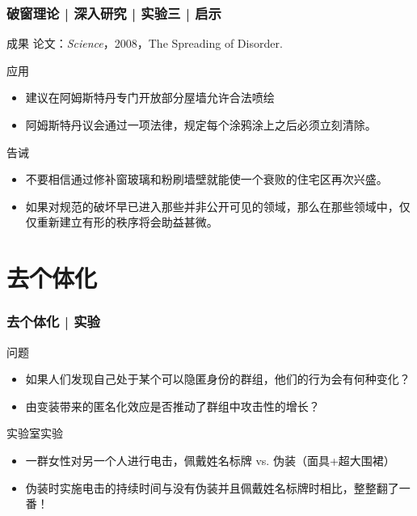 \begin{frame}
  \frametitle{破窗理论 | 深入研究 | 实验三 | 启示}
  \begin{block}{成果}
    论文：\textit{Science}，2008，The Spreading of Disorder.
  \end{block}
  \pause
  \begin{block}{应用}
    \begin{itemize}
      \item 建议在阿姆斯特丹专门开放部分屋墙允许合法喷绘
      \item 阿姆斯特丹议会通过一项法律，规定每个涂鸦涂上之后必须立刻清除。
    \end{itemize}
  \end{block}
  \pause
  \begin{block}{告诫}
    \begin{itemize}
       \item  不要相信通过修补窗玻璃和粉刷墙壁就能使一个衰败的住宅区再次兴盛。
       \item 如果对规范的破坏早已进入那些并非公开可见的领域，那么在那些领域中，仅仅重新建立有形的秩序将会助益甚微。
    \end{itemize}
  \end{block}
\end{frame}

\section{去个体化}
\begin{frame}
  \frametitle{去个体化 | 实验}
  \begin{block}{问题}
    \begin{itemize}
      \item 如果人们发现自己处于某个可以隐匿身份的群组，他们的行为会有何种变化？
      \item 由变装带来的匿名化效应是否推动了群组中攻击性的增长？
    \end{itemize}
  \end{block}
  \pause
  \begin{block}{实验室实验}
    \begin{itemize}
      \item 一群女性对另一个人进行电击，佩戴姓名标牌 vs. 伪装（面具+超大围裙）
      \item 伪装时实施电击的持续时间与没有伪装并且佩戴姓名标牌时相比，整整翻了一番！
    \end{itemize}
  \end{block}
\end{frame}

